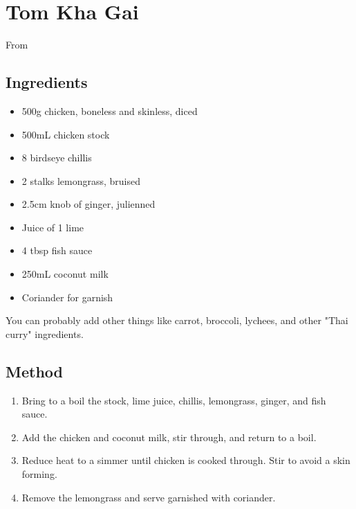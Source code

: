 \section{Tom Kha Gai}

From 


\subsection{Ingredients}

\begin{itemize}
        \item 500g chicken, boneless and skinless, diced
	\item 500mL chicken stock
	\item 8 birdseye chillis
	\item 2 stalks lemongrass, bruised
	\item 2.5cm knob of ginger, julienned
	\item Juice of 1 lime
	\item 4 tbsp fish sauce
	\item 250mL coconut milk
	\item Coriander for garnish
\end{itemize}

You can probably add other things like carrot, broccoli, lychees, and other "Thai curry" ingredients.

\subsection{Method}

\begin{enumerate}
	\item Bring to a boil the stock, lime juice, chillis, lemongrass, ginger, and fish sauce.
	\item Add the chicken and coconut milk, stir through, and return to a boil.
	\item Reduce heat to a simmer until chicken is cooked through. Stir to avoid a skin forming.
	\item Remove the lemongrass and serve garnished with coriander.
\end{enumerate}
